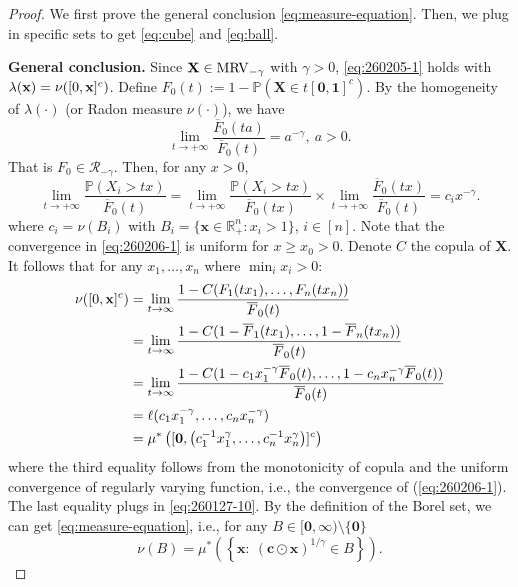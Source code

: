 \documentclass[12pt]{article}
\theoremstyle{plain}
\theoremstyle{plain}
\theoremstyle{definition}
\renewcommand{\Pr}{\mathbb{P}}
\newcommand{\R}{\mathbb{R}}
\begin{document}
\Intermediate*
\begin{proof}
We first prove the general conclusion \eqref{eq:measure-equation}. Then, we plug in specific sets to get \eqref{eq:cube} and \eqref{eq:ball}.

\noindent\textbf{General conclusion.}
Since ${\bf X}\in {\rm MRV}_{-\gamma}$ with $\gamma>0$, \eqref{eq:260205-1} holds with $\lambda({\bf x})=\nu\!\left([0,\mathbf{x}]^{c}\right)$. 
Define $F_0(t):=1-\Pr\left(\mathbf{X}\in t[\mathbf{0},\mathbf{1}]^c\right)$. By the homogeneity of $\lambda(\cdot)$ (or Radon measure $\nu(\cdot)$), we have
\[
\lim_{t\to+\infty} \frac{\overline{F}_0(ta)}{\overline{F}_0(t)}=a^{-\gamma},~a>0.
\]
That is $F_0\in\mathscr{R}_{-\gamma}$. Then, for any $x>0$,
\begin{equation}
\label{eq:260206-1}
\lim_{t\to+\infty}\frac{\Pr(X_i>tx)}{\overline{F}_0(t)}
=\lim_{t\to+\infty}\frac{\Pr(X_i>tx)}{\overline{F}_0(tx)}
\times\lim_{t\to+\infty}\frac{\overline{F}_0(tx)}{\overline{F}_0(t)}
=c_ix^{-\gamma}.   
\end{equation}
where $c_i = \nu(B_i)$ with $B_i=\{\mathbf{x}\in\R_+^n:x_i>1\}$, $i\in [n]$.
Note that the convergence in \eqref{eq:260206-1} is uniform for $x\ge x_0>0$. 
Denote $C$ the copula of $\mathbf{X}$. It follows that for any $x_1,\dots,x_n$ where $\min_i x_i > 0$:
\begin{align}
\nu\!\left([0,\mathbf{x}]^{c}\right)
&=  \lim_{t\to\infty}\frac{1-C(F_1(tx_1),\dots,F_n(tx_n))}{\overline{F}_0(t)}\notag\\
&= \lim_{t\to\infty}\frac{1-C(1-\overline{F}_1(tx_1),\dots,1-\overline{F}_n(tx_n))}{\overline{F}_0(t)} \notag\\
&= \lim_{t\to\infty}\frac{1-C(1-c_1x_1^{-\gamma}\overline{F}_0(t),\dots,1-c_nx_n^{-\gamma}\overline{F}_0(t))}{\overline{F}_0(t)}\notag\\ 
& = \ell(c_1x_1^{-\gamma},\dots,c_nx_n ^{-\gamma})\notag\\
& = \mu^*\left([\mathbf{0},\left(c_1^{-1}x_1^{\gamma},\dots,c_n^{-1}x_n^{\gamma}\right)]^c\right)
\label{eq:260206-4}
\end{align}
where the third equality follows from the monotonicity of copula and the uniform convergence of regularly varying  function, i.e., the convergence of (\ref{eq:260206-1}). The last equality plugs in \eqref{eq:260127-10}. By the definition of the Borel set, we can get \eqref{eq:measure-equation}, i.e., for any $B\in[\mathbf{0},\bm{\infty})\setminus\{\mathbf{0}\}$
\[
\nu(B) = \mu^*\left(\left\{\mathbf{x}:~\left(\mathbf{c}\odot\mathbf{x}\right)^{1/\gamma}\in B\right\}\right).
\]


\end{proof}
\end{document}
